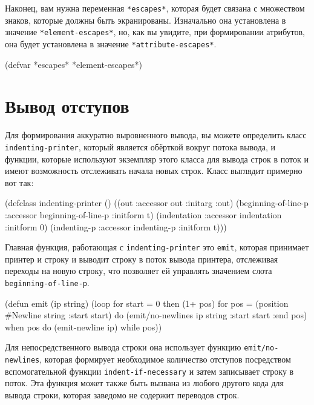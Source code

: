 Наконец, вам нужна переменная \lstinline{*escapes*}, которая будет связана с множеством знаков,
которые должны быть экранированы. Изначально она установлена в значение
\lstinline{*element-escapes*}, но, как вы увидите, при формировании атрибутов, она будет
установлена в значение \lstinline{*attribute-escapes*}.

\begin{myverb}
(defvar *escapes* *element-escapes*)
\end{myverb}

\section{Вывод отступов}

Для формирования аккуратно выровненного вывода, вы можете определить класс
\lstinline{indenting-printer}, который является обёрткой вокруг потока вывода, и функции,
которые используют экземпляр этого класса для вывода строк в поток и имеют возможность
отслеживать начала новых строк. Класс выглядит примерно вот так:

\begin{myverb}
(defclass indenting-printer ()
  ((out                 :accessor out                 :initarg :out)
   (beginning-of-line-p :accessor beginning-of-line-p :initform t)
   (indentation         :accessor indentation         :initform 0)
   (indenting-p         :accessor indenting-p         :initform t)))
\end{myverb}

Главная функция, работающая с \lstinline{indenting-printer} это \lstinline{emit}, которая принимает
принтер и строку и выводит строку в поток вывода принтера, отслеживая переходы на новую
строку, что позволяет ей управлять значением слота \lstinline{beginning-of-line-p}.

\begin{myverb}
(defun emit (ip string)
  (loop for start = 0 then (1+ pos)
     for pos = (position #\bslash{}Newline string :start start)
     do (emit/no-newlines ip string :start start :end pos)
     when pos do (emit-newline ip)
     while pos))
\end{myverb}

Для непосредственного вывода строки она использует функцию \lstinline{emit/no-newlines},
которая формирует необходимое количество отступов посредством вспомогательной функции
\lstinline{indent-if-necessary} и затем записывает строку в поток.  Эта функция может также
быть вызвана из любого другого кода для вывода строки, которая заведомо не содержит
переводов строк.

